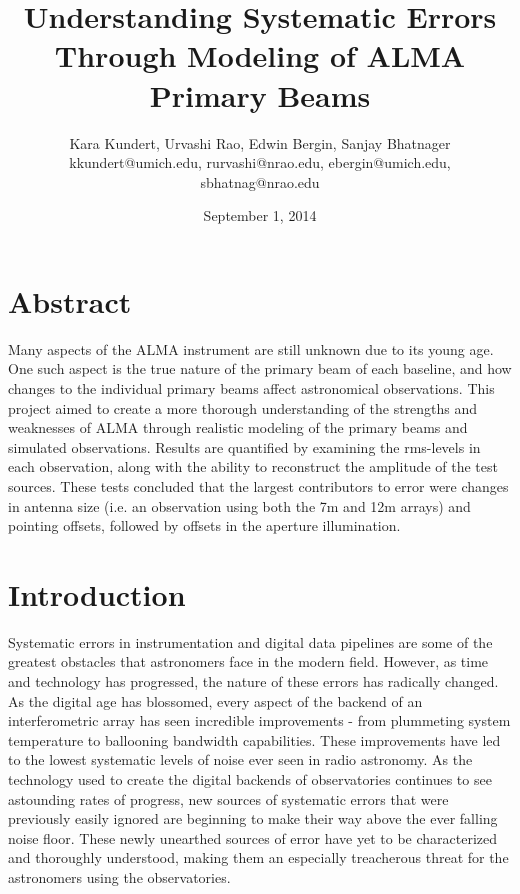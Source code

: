 \documentclass[11pt]{article}
\makeatletter
\newcommand{\thetitle}{Understanding Systematic Errors Through Modeling of ALMA 
Primary Beams}
\newcommand{\theauthor}{Kara Kundert, Urvashi Rao, Edwin Bergin, Sanjay 
Bhatnager}
\newcommand{\theauthorsemail}{kkundert@umich.edu, rurvashi@nrao.edu, 
ebergin@umich.edu, sbhatnag@nrao.edu}
\newcommand{\thedate}{September 1, 2014}
\makeatother
\begin{document}
\title{
    \sffamily\bfseries\huge
    \thetitle \\
}
\author{
    \sffamily\theauthor \\
    \sffamily\theauthorsemail \\
}
\date{\thedate}
\maketitle
\sloppy

\section{Abstract}

Many aspects of the ALMA instrument are still unknown due to its young age.
One such aspect is the true nature of the primary beam of each baseline, and
how changes to the individual primary beams affect astronomical
observations. This project aimed to create a more thorough
understanding of the strengths and weaknesses of ALMA through realistic
modeling of the primary beams and simulated observations. Results are
quantified by examining the rms-levels in each observation, along with the
ability to reconstruct the amplitude of the test sources. These tests
concluded that the largest contributors to error were changes in antenna
size (i.e. an observation using both the 7m and 12m arrays) and pointing
offsets, followed by offsets in the aperture illumination.

\section{Introduction}

Systematic errors in instrumentation and digital data pipelines are some of the 
greatest obstacles that astronomers face in the modern field. However, as time 
and technology has progressed, the nature of these errors has radically 
changed. As the digital age has blossomed, every aspect of the backend of an 
interferometric array has seen incredible improvements - from plummeting system 
temperature to ballooning bandwidth capabilities. These improvements have led 
to the lowest systematic levels of noise ever seen in radio astronomy. As the 
technology used to create the digital backends of observatories continues to 
see astounding rates of progress, new sources of systematic errors that were 
previously easily ignored are beginning to make their way above the ever 
falling noise floor.  These newly unearthed sources of error have yet to be 
characterized and thoroughly understood, making them an especially treacherous 
threat for the astronomers using the observatories.
\end{document}
